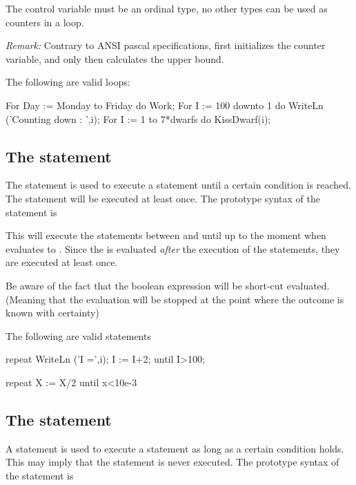 \documentclass{report}
\begin{document}
The control variable must be an ordinal type, no other 
types can be used as counters in a loop.

{\em Remark:} Contrary to ANSI pascal specifications, \fpc first initializes
the counter variable, and only then calculates the upper bound.

The following are valid loops:
\begin{listing}
For Day := Monday to Friday do Work;
For I := 100 downto 1 do
  WriteLn ('Counting down : ',i);
For I := 1 to 7*dwarfs do KissDwarf(i); 
\end{listing}

\subsection{The  statement}

The  statement is used to execute a statement until a certain
condition is reached. The statement will be executed at least once.
The prototype syntax of the  statement is



This will execute the statements between  and {until} up to
the moment when  evaluates to . 
Since the  is evaluated {\em after} the execution of the
statements, they are executed at least once.

Be aware of the fact that the boolean expression  will be 
short-cut evaluated. (Meaning that the evaluation will be stopped at the 
point where the outcome is known with certainty)

The following are valid  statements
\begin{listing}
repeat
  WriteLn ('I =',i);
  I := I+2;
until I>100;

repeat
 X := X/2
until x<10e-3
\end{listing}

\subsection{The  statement}

A  statement is used to execute a statement as long as a certain
condition holds. This may imply that the statement is never executed.  
The prototype syntax of the  statement is


\end{document}
